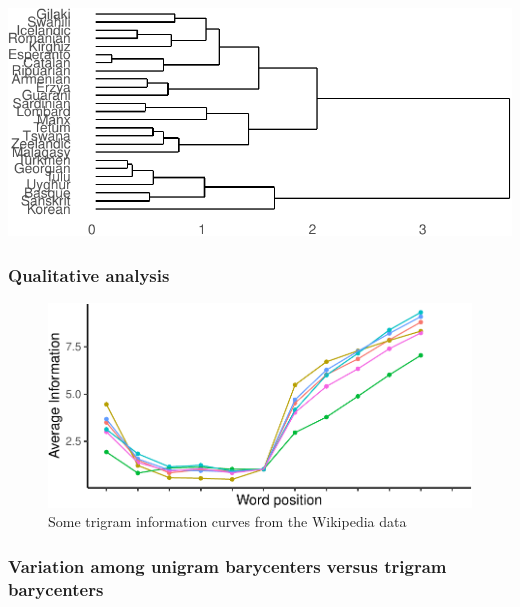 \documentclass[man,floatsintext]{apa6}
\begin{document}
\includegraphics{figs/dendro-1.pdf}

\hypertarget{qualitative-analysis}{%
\subsubsection{Qualitative analysis}\label{qualitative-analysis}}

\begin{figure}
\centering
\includegraphics{figs/wiki-trigrams-1.pdf}
\caption{\label{fig:wiki-trigrams}Some trigram information curves from the Wikipedia data}
\end{figure}

\hypertarget{variation-among-unigram-barycenters-versus-trigram-barycenters}{%
\subsubsection{Variation among unigram barycenters versus trigram barycenters}\label{variation-among-unigram-barycenters-versus-trigram-barycenters}}
\end{document}

